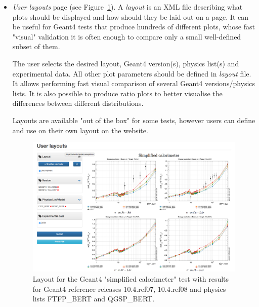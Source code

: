 \begin{itemize}
\item \textit{User layouts} page (see Figure~\ref{fig:layouts}). A \textit{layout} is an XML file describing what plots should be displayed and how should they be laid out on a page. It can be useful for Geant4 tests that produce hundreds of different plots, whose fast "visual" validation it is often enough to compare only a small well-defined subset of them.

The user selects the desired layout, Geant4 version(s), physics list(s) and experimental data. All other plot parameters should be defined in \textit{layout} file. It allows performing fast visual comparison of several Geant4 versions/physics lists. It is also possible to produce ratio plots to better visualise the differences between different distributions.

Layouts are available "out of the box" for some tests, however users can define and use on their own layout on the website.

\begin{figure}[h]
    \centering
    \includegraphics[width=\textwidth,clip]{layout_sc.png}
    \caption{Layout for the Geant4 "simplified calorimeter" test with results for Geant4 reference releases 10.4.ref07, 10.4.ref08 and physics lists FTFP\_BERT and QGSP\_BERT.}
    \label{fig:layouts}
\end{figure}

\end{itemize}

